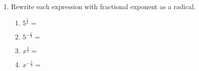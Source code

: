 \documentclass[12pt, twoside]{article}
\begin{document}
\begin{enumerate}[itemsep=0.5cm]
\item Rewrite each expression with fractional exponent as a radical.
    \begin{multicols}{2}
      \begin{enumerate}[itemsep=1cm]
        \item $\displaystyle 5^{\frac{1}{4}}=$
        \item $\displaystyle 5^{-\frac{1}{3}}=$
        \item $\displaystyle x^{\frac{2}{5}}=$
        \item $\displaystyle x^{-\frac{1}{3}}=$
      \end{enumerate}
      \end{multicols}
       
\end{enumerate}
\end{document}
